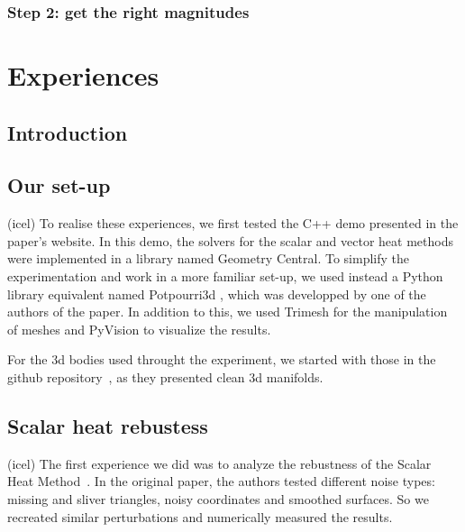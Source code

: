 \documentclass[sigconf]{acmart}
\begin{document}
\subsubsection{Step 2: get the right magnitudes}

\section{Experiences}
\subsection{Introduction}

\subsection{Our set-up}
(icel)
To realise these experiences, we first tested the C++ demo presented in the paper's website.
In this demo, the solvers for the scalar and vector heat methods were implemented in a library named Geometry Central.
To simplify the experimentation and work in a more familiar set-up, we used instead a Python library equivalent named Potpourri3d \cite{library_potpourri3d}, 
which was developped by one of the authors of the paper.
In addition to this, we used Trimesh for the manipulation of meshes and PyVision to visualize the results.

For the 3d bodies used throught the experiment, we started with those in the github repository~\cite{github_objects_repo},
as they presented clean 3d manifolds.

\subsection{Scalar heat rebustess}
(icel)
The first experience we did was to analyze the rebustness of the Scalar Heat Method~\cite{Crane:2017:HMD}. In
the original paper, the authors tested different noise types: missing and sliver triangles,
noisy coordinates and smoothed surfaces. So we recreated similar perturbations and numerically
measured the results.
\end{document}
